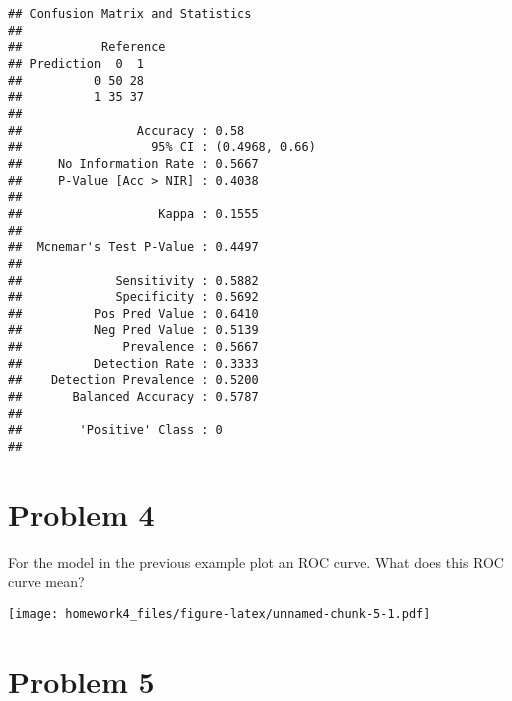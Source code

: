 \documentclass[
]{article}
\newenvironment{Shaded}{\begin{snugshade}}{\end{snugshade}}
\newcommand{\DataTypeTok}[1]{\textcolor[rgb]{0.13,0.29,0.53}{#1}}
\newcommand{\KeywordTok}[1]{\textcolor[rgb]{0.13,0.29,0.53}{\textbf{#1}}}
\newcommand{\NormalTok}[1]{#1}
\newcommand{\OperatorTok}[1]{\textcolor[rgb]{0.81,0.36,0.00}{\textbf{#1}}}
\newcommand{\OtherTok}[1]{\textcolor[rgb]{0.56,0.35,0.01}{#1}}
\newcommand{\StringTok}[1]{\textcolor[rgb]{0.31,0.60,0.02}{#1}}
\begin{document}
\begin{verbatim}
## Confusion Matrix and Statistics
## 
##           Reference
## Prediction  0  1
##          0 50 28
##          1 35 37
##                                         
##                Accuracy : 0.58          
##                  95% CI : (0.4968, 0.66)
##     No Information Rate : 0.5667        
##     P-Value [Acc > NIR] : 0.4038        
##                                         
##                   Kappa : 0.1555        
##                                         
##  Mcnemar's Test P-Value : 0.4497        
##                                         
##             Sensitivity : 0.5882        
##             Specificity : 0.5692        
##          Pos Pred Value : 0.6410        
##          Neg Pred Value : 0.5139        
##              Prevalence : 0.5667        
##          Detection Rate : 0.3333        
##    Detection Prevalence : 0.5200        
##       Balanced Accuracy : 0.5787        
##                                         
##        'Positive' Class : 0             
## 
\end{verbatim}

\hypertarget{problem-4}{%
\section{Problem 4}\label{problem-4}}

For the model in the previous example plot an ROC curve. What does this
ROC curve mean?

\begin{Shaded}
\end{Shaded}

\texttt{[image: homework4\_files/figure-latex/unnamed-chunk-5-1.pdf]}

\hypertarget{problem-5}{%
\section{Problem 5}\label{problem-5}}
\end{document}
